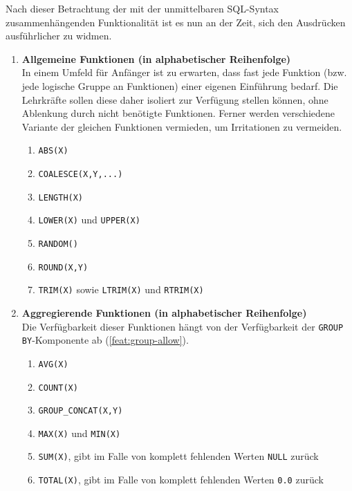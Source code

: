 Nach dieser Betrachtung der mit der unmittelbaren SQL-Syntax zusammenhängenden Funktionalität ist es nun an der Zeit, sich den Ausdrücken ausführlicher zu widmen.

\begin{enumerate}
\item \textbf{Allgemeine Funktionen (in alphabetischer Reihenfolge)} \\
  In einem Umfeld für Anfänger ist zu erwarten, dass fast jede Funktion (bzw. jede logische Gruppe an Funktionen) einer eigenen Einführung bedarf. Die Lehrkräfte sollen diese daher isoliert zur Verfügung stellen können, ohne Ablenkung durch nicht benötigte Funktionen. Ferner werden verschiedene Variante der gleichen Funktionen vermieden, um Irritationen zu vermeiden.
  \begin{enumerate}
  \item \label{feat:fun-abs} \texttt{ABS(X)}
  \item \label{feat:fun-coalesce} \texttt{COALESCE(X,Y,...)}
  \item \label{feat:fun-length} \texttt{LENGTH(X)}
  \item \label{feat:fun-casing} \texttt{LOWER(X)} und \texttt{UPPER(X)}
  \item \label{feat:fun-random} \texttt{RANDOM()}
  \item \label{feat:fun-round} \texttt{ROUND(X,Y)}
  \item \label{feat:fun-trim} \texttt{TRIM(X)} sowie \texttt{LTRIM(X)} und \texttt{RTRIM(X)}
  \end{enumerate}

\item \textbf{Aggregierende Funktionen (in alphabetischer Reihenfolge)} \\
  Die Verfügbarkeit dieser Funktionen hängt von der Verfügbarkeit der \texttt{GROUP BY}-Komponente ab (\ref{feat:group-allow}).
  \begin{enumerate}
  \item \label{feat:fun-avg} \texttt{AVG(X)}
  \item \label{feat:fun-count} \texttt{COUNT(X)}
  \item \label{feat:fun-group-concat} \texttt{GROUP\_CONCAT(X,Y)}
  \item \label{feat:fun-max-min} \texttt{MAX(X)} und \texttt{MIN(X)}
  \item \label{feat:fun-sum} \texttt{SUM(X)}, gibt im Falle von komplett fehlenden Werten \texttt{NULL} zurück
  \item \label{feat:fun-total} \texttt{TOTAL(X)}, gibt im Falle von komplett fehlenden Werten \texttt{0.0} zurück
  \end{enumerate}
\end{enumerate}


